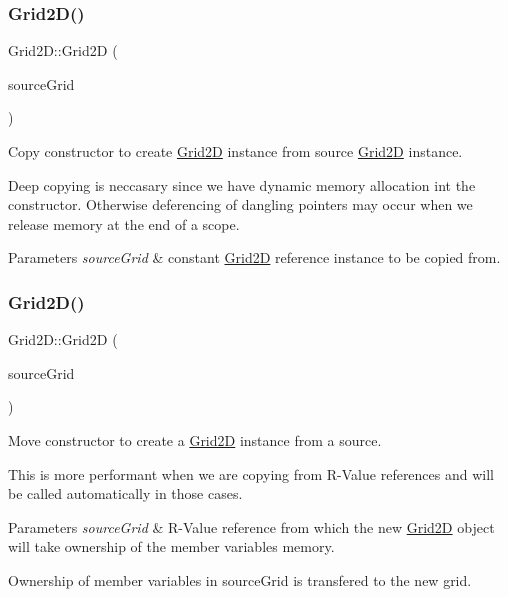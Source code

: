 \subsubsection{\texorpdfstring{Grid2\+D()}{Grid2D()}\hspace{0.1cm}{\footnotesize\ttfamily [2/3]}}
{\footnotesize\ttfamily Grid2\+D\+::\+Grid2D (\begin{DoxyParamCaption}\item[{const \hyperlink{class_grid2_d}{Grid2D} \&}]{source\+Grid }\end{DoxyParamCaption})}



Copy constructor to create \hyperlink{class_grid2_d}{Grid2D} instance from source \hyperlink{class_grid2_d}{Grid2D} instance. 

Deep copying is neccasary since we have dynamic memory allocation int the constructor. Otherwise deferencing of dangling pointers may occur when we release memory at the end of a scope.


\begin{DoxyParams}{Parameters}
{\em source\+Grid} & constant \hyperlink{class_grid2_d}{Grid2D} reference instance to be copied from. \\
\hline
\end{DoxyParams}
\mbox{\label{class_grid2_d_a766e9b46b39b3a27d432637037eee951}} 
\subsubsection{\texorpdfstring{Grid2\+D()}{Grid2D()}\hspace{0.1cm}{\footnotesize\ttfamily [3/3]}}
{\footnotesize\ttfamily Grid2\+D\+::\+Grid2D (\begin{DoxyParamCaption}\item[{\hyperlink{class_grid2_d}{Grid2D} \&\&}]{source\+Grid }\end{DoxyParamCaption})}



Move constructor to create a \hyperlink{class_grid2_d}{Grid2D} instance from a source. 

This is more performant when we are copying from R-\/\+Value references and will be called automatically in those cases.


\begin{DoxyParams}{Parameters}
{\em source\+Grid} & R-\/\+Value reference from which the new \hyperlink{class_grid2_d}{Grid2D} object will take ownership of the member variables memory. \\
\hline
\end{DoxyParams}
Ownership of member variables in source\+Grid is transfered to the new grid.

